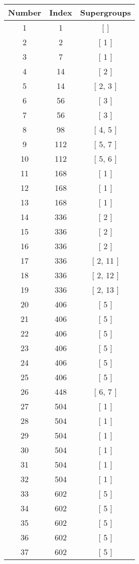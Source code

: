\begin{center}
\begin{longtable}[H]{|| c c c ||}
\hline
Number &  Index &  Supergroups
\\\hline
1 & 1 & [  ]
\\\hline
2 & 2 & [ 1 ]
\\\hline
3 & 7 & [ 1 ]
\\\hline
4 & 14 & [ 2 ]
\\\hline
5 & 14 & [ 2, 3 ]
\\\hline
6 & 56 & [ 3 ]
\\\hline
7 & 56 & [ 3 ]
\\\hline
8 & 98 & [ 4, 5 ]
\\\hline
9 & 112 & [ 5, 7 ]
\\\hline
10 & 112 & [ 5, 6 ]
\\\hline
11 & 168 & [ 1 ]
\\\hline
12 & 168 & [ 1 ]
\\\hline
13 & 168 & [ 1 ]
\\\hline
14 & 336 & [ 2 ]
\\\hline
15 & 336 & [ 2 ]
\\\hline
16 & 336 & [ 2 ]
\\\hline
17 & 336 & [ 2, 11 ]
\\\hline
18 & 336 & [ 2, 12 ]
\\\hline
19 & 336 & [ 2, 13 ]
\\\hline
20 & 406 & [ 5 ]
\\\hline
21 & 406 & [ 5 ]
\\\hline
22 & 406 & [ 5 ]
\\\hline
23 & 406 & [ 5 ]
\\\hline
24 & 406 & [ 5 ]
\\\hline
25 & 406 & [ 5 ]
\\\hline
26 & 448 & [ 6, 7 ]
\\\hline
27 & 504 & [ 1 ]
\\\hline
28 & 504 & [ 1 ]
\\\hline
29 & 504 & [ 1 ]
\\\hline
30 & 504 & [ 1 ]
\\\hline
31 & 504 & [ 1 ]
\\\hline
32 & 504 & [ 1 ]
\\\hline
33 & 602 & [ 5 ]
\\\hline
34 & 602 & [ 5 ]
\\\hline
35 & 602 & [ 5 ]
\\\hline
36 & 602 & [ 5 ]
\\\hline
37 & 602 & [ 5 ]

\end{longtable}
\end{center}
